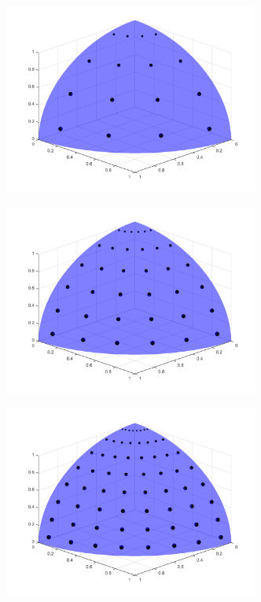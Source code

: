 \begin{figure}
\begin{subfigure}[b]{0.48\textwidth}
		\caption{}
	\end{subfigure}
	\hfill
	\begin{subfigure}[b]{0.48\textwidth}
		\centering
		\includegraphics[width=0.92\textwidth]{figures/sec_Sn/PGLC4_4.png}
		\caption{}
	\end{subfigure}
	\vfill
	\begin{subfigure}[b]{0.48\textwidth}
		\centering
		\includegraphics[width=0.92\textwidth]{figures/sec_Sn/PGLC6_6.png}
		\caption{}
	\end{subfigure}
	\hfill
	\begin{subfigure}[b]{0.48\textwidth}
		\centering
		\includegraphics[width=0.92\textwidth]{figures/sec_Sn/PGLC8_8.png}

\end{subfigure}
\end{figure}
